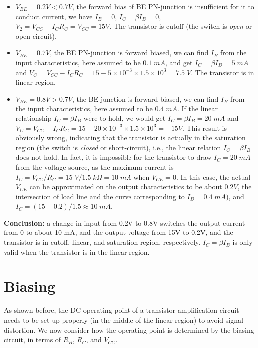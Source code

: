 \documentclass{article}
\begin{document}
\begin{itemize}
\item $V_{BE}=0.2V < 0.7V$, the forward bias of BE PN-junction is insufficient
  for it to conduct current, we have $I_B=0$, $I_C=\beta I_B=0$, $V_2
  =V_{CC}-I_C R_C=V_{CC}=15V$. The transistor is cutoff (the switch is 
  {\em open} or open-circuit).
\item $V_{BE}=0.7V$, the BE PN-junction is forward biased, we can find $I_B$
  from the input characteristics, here assumed to be $0.1\;mA$, and get
  $I_C=\beta I_B=5\;mA$ and 
  $V_C=V_{CC}-I_C R_C=15-5\times 10^{-3} \times 1.5\times 10^{3} =7.5\; V$. 
  The transistor is in linear region.
\item $V_{BE}=0.8V>0.7V$, the BE junction is forward biased, we can find $I_B$
  from the input characteristics, here assumed to be $0.4\;mA$. If the linear
  relationship $I_C=\beta I_B$ were to hold, we would get $I_C=\beta I_B=20\;mA$
  and $V_C=V_{CC}-I_C R_C=15-20\times 10^{-3} \times 1.5\times 10^{3}=-15 V$. 
  This result is obviously wrong, indicating that the transistor is actually 
  in the saturation region (the switch is {\em closed} or short-circuit), 
  i.e., the linear relation $I_C=\beta I_B$ does not hold. In fact, it is 
  impossible for the transistor to draw $I_C=20\;mA$ from the voltage source, 
  as the maximum current is $I_C=V_{CC}/R_C=15\;V/1.5\; k\Omega=10\;mA$ when
  $V_{CE}=0$. In this case, the actual $V_{CE}$ can be approximated on the output 
  characteristics to be about $0.2V$, the intersection of load line and the 
  curve corresponding to $I_B=0.4\;mA$), and $I_C=(15-0.2)/1.5\approx 10\;mA$. 
\end{itemize}
{\bf Conclusion: } a change in input from 0.2V to 0.8V switches the output 
current from 0 to about 10 mA, and the output voltage from 15V to 0.2V,
and the transistor is in cutoff, linear, and saturation region, respectively. 
$I_C=\beta I_B$ is only valid when the transistor is in the linear region.

\section*{Biasing}

As shown before, the DC operating point of a transistor amplification circuit
needs to be set up properly (in the middle of the linear region) to avoid
signal distortion. We now consider how the operating point is determined by 
the biasing circuit, in terms of $R_B$, $R_C$, and $V_{CC}$.
\end{document}
